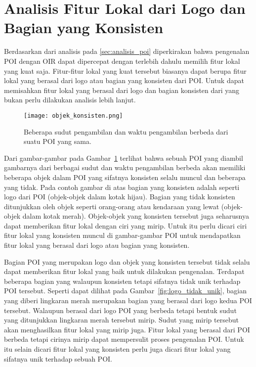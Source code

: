 \section{Analisis Fitur Lokal dari Logo dan Bagian yang Konsisten}
\label{sec:analisis_logo}
Berdasarkan dari analisis pada \ref{sec:analisis_poi} diperkirakan bahwa pengenalan POI dengan OIR dapat dipercepat dengan terlebih dahulu memilih fitur lokal yang kuat saja. Fitur-fitur lokal yang kuat tersebut biasanya dapat berupa fitur lokal yang berasal dari logo atau bagian yang konsisten dari POI. Untuk dapat memisahkan fitur lokal yang berasal dari logo dan bagian konsisten dari yang bukan perlu dilakukan analisis lebih lanjut.

\begin{figure}[H]
	\centering
	\texttt{[image: objek\_konsisten.png]}
	\caption{Beberapa sudut pengambilan dan waktu pengambilan berbeda dari suatu POI yang sama.}
	\label{fig:objek_konsisten}
\end{figure}

Dari gambar-gambar pada Gambar~\ref{fig:objek_konsisten} terlihat bahwa sebuah POI yang diambil gambarnya dari berbagai sudut dan waktu pengambilan berbeda akan memiliki beberapa objek dalam POI yang sifatnya konsisten selalu muncul dan beberapa yang tidak. Pada contoh gambar di atas bagian yang konsisten adalah seperti logo dari POI (objek-objek dalam kotak hijau). Bagian yang tidak konsisten ditunjukkan oleh objek seperti orang-orang atau kendaraan yang lewat (objek-objek dalam kotak merah). Objek-objek yang konsisten tersebut juga seharusnya dapat memberikan fitur lokal dengan ciri yang mirip. Untuk itu perlu dicari ciri fitur lokal yang konsisten muncul di gambar-gambar POI untuk mendapatkan fitur lokal yang berasal dari logo atau bagian yang konsisten.

Bagian POI yang merupakan logo dan objek yang konsisten tersebut tidak selalu dapat memberikan fitur lokal yang baik untuk dilakukan pengenalan. Terdapat beberapa bagian yang walaupun konsisten tetapi sifatnya tidak unik terhadap POI tersebut. Seperti dapat dilihat pada Gambar~\ref{fig:logo_tidak_unik}, bagian yang diberi lingkaran merah merupakan bagian yang berasal dari logo kedua POI tersebut. Walaupun berasal dari logo POI yang berbeda tetapi bentuk sudut yang ditunjukkan lingkaran merah tersebut mirip. Sudut yang mirip tersebut akan menghasilkan fitur lokal yang mirip juga. Fitur lokal yang berasal dari POI berbeda tetapi cirinya mirip dapat mempersulit proses pengenalan POI. Untuk itu selain dicari fitur lokal yang konsisten perlu juga dicari fitur lokal yang sifatnya unik terhadap sebuah POI.

